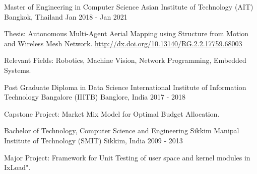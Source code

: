 

\begin{cventries}

  \cventry
    {Master of Engineering in Computer Science} %
    {Asian Institute of Technology (AIT)} %
    {Bangkok, Thailand} %
    {Jan 2018 - Jan 2021} %
    {
      \begin{cvitems} %
      \item {Thesis: Autonomous Multi-Agent Aerial Mapping using Structure from Motion and Wireless Mesh Network. \url{http://dx.doi.org/10.13140/RG.2.2.17759.68003}}
      \item {Relevant Fields: Robotics, Machine Vision, Network Programming, Embedded Systems.}
      \end{cvitems}
    }

  \cventry
    {Post Graduate Diploma in Data Science} %
    {International Institute of Information Technology Bangalore (IIITB)} %
    {Banglore, India} %
    {2017 - 2018} %
    {
      \begin{cvitems} %
      \item {Capstone Project: Market Mix Model for Optimal Budget Allocation.}
      \end{cvitems}
    }

  \cventry
    {Bachelor of Technology, Computer Science and Engineering} %
    {Sikkim Manipal Institute of Technology (SMIT)} %
    {Sikkim, India} %
    {2009 - 2013} %
    {
      \begin{cvitems} %
      \item {Major Project: Framework for Unit Testing of user space and kernel modules in IxLoad".}
      \end{cvitems}
    }
\end{cventries}
